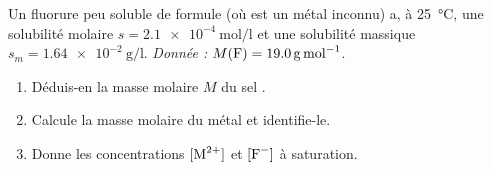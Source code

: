 \documentclass[11pt,a4paper]{article}
\begin{document}
\begin{exo}
Un fluorure peu soluble de formule  (où  est un métal inconnu) a, à \qty{25}{\degreeCelsius},
une solubilité molaire $s=\qty{2.1e-4}{\mole\per\litre}$ et une solubilité massique
$s_m=\qty{1.64e-2}{\gram\per\litre}$. \emph{Donnée :} $M(\ce{F})=\qty{19.0}{\gram\per\mole}$.
\begin{enumerate}[label=\alph*)]
  \item Déduis-en la masse molaire $M$ du sel .
  \item Calcule la masse molaire du métal  et identifie-le.
  \item Donne les concentrations $[\ce{M^{2+}}]$ et $[\ce{F-}]$ à saturation.
\end{enumerate}
\end{exo}
\end{document}

